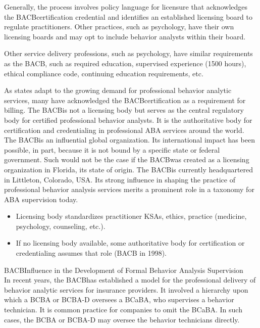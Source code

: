 Generally, the process involves policy language for licensure that acknowledges the BACB\textregistered certification credential and identifies an established licensing board to regulate practitioners. Other practices, such as psychology, have their own licensing boards and may opt to include behavior analysts within their board. 

Other service delivery professions, such as psychology, have similar requirements as the BACB\textregistered, such as required education, supervised experience (1500 hours), ethical compliance code, continuing education requirements, etc. 

As states adapt to the growing demand for professional behavior analytic services, many have acknowledged the BACB\textregistered certification as a requirement for billing. The BACB\textregistered is not a licensing body but serves as the central regulatory body for certified professional behavior analysts. It is the authoritative body for certification and credentialing in professional ABA services around the world. The BACB\textregistered is an influential global organization. Its international impact has been possible, in part, because it is not bound by a specific state or federal government. Such would not be the case if the BACB\textregistered was created as a licensing organization in Florida, its state of origin. The BACB\textregistered is currently headquartered in Littleton, Colorado, USA. Its strong influence in shaping the practice of professional behavior analysis services merits a prominent role in a taxonomy for ABA supervision today. 

\begin{itemize}
\item Licensing body standardizes practitioner KSAs, ethics, practice (medicine, psychology, counseling, etc.).
\item If no licensing body available, some authoritative body for certification or credentialing assumes that role (BACB in 1998).
\end{itemize}

BACB\textregistered Influence in the Development of Formal Behavior Analysis Supervision\\

In recent years, the BACB\textregistered has established a model for the professional delivery of behavior analytic services for insurance providers. It involved a hierarchy upon which a BCBA or BCBA-D oversees a BCaBA, who supervises a behavior technician. It is common practice for companies to omit the BCaBA. In such cases, the BCBA or BCBA-D may oversee the behavior technicians directly.

